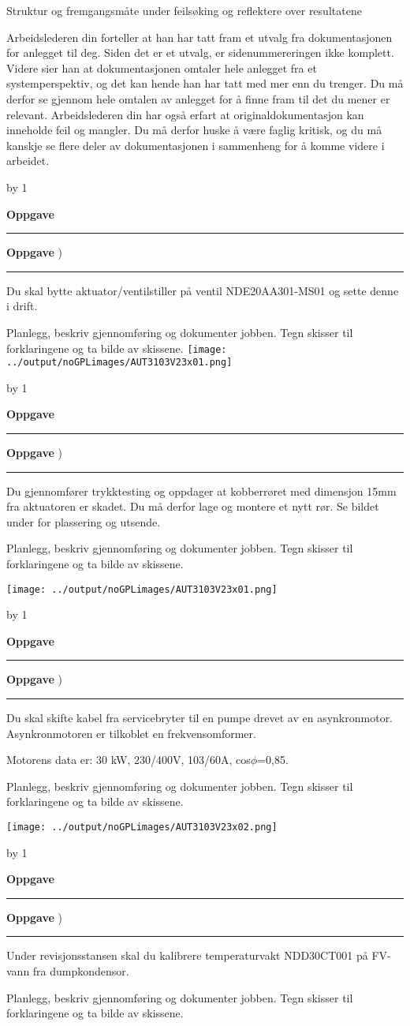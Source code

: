 \documentclass[12pt,a4paper]{article}
\def\oppgave{
            \advance\questnum by 1
	    \ifthenelse{\questnum>0\AND \questnum<9}
	    {
                \vskip 1cm
		\textbf{Oppgave}\hskip 5pt\the\questnum \hfill \hfill
		\vskip 3pt
		\hrule
	\vskip 0.5cm}
	{
                \vskip 1cm
		\textbf{Oppgave}\hskip 5pt \the\questnum \hfill \hfill)
		\vskip 3pt \hrule \vskip 0.5cm }

		}
\begin{document}
Struktur og fremgangsmåte under feilsøking og reflektere over resultatene

\vskip  0.25cm
 

Arbeidslederen din forteller at han har tatt fram et utvalg fra dokumentasjonen for anlegget til deg. Siden det er et utvalg, er sidenummereringen ikke komplett. Videre sier han at dokumentasjonen omtaler hele anlegget fra et systemperspektiv, og det kan hende han har tatt med mer enn du trenger. Du må derfor se gjennom hele omtalen av anlegget for å finne fram til det du mener er relevant. Arbeidslederen din har også erfart at originaldokumentasjon kan inneholde feil og mangler. Du må derfor huske å være faglig kritisk, og du må kanskje se flere deler av dokumentasjonen i sammenheng for å komme videre i arbeidet.
\oppgave{}%
Du skal bytte aktuator/ventilstiller på ventil NDE20AA301-MS01 og sette denne i drift. 
\vskip 0.25cm

Planlegg, beskriv gjennomføring og dokumenter jobben. Tegn skisser til forklaringene og ta bilde av skissene. 
\vskip 0.25cm
\texttt{[image: ../output/noGPLimages/AUT3103V23x01.png]}\\
\newpage
\oppgave{}%
Du gjennomfører trykktesting og oppdager at kobberrøret med dimensjon 15mm fra aktuatoren er skadet. Du må derfor lage og montere et nytt rør. Se bildet under for plassering og utsende. 

\vskip 0.25cm
Planlegg, beskriv gjennomføring og dokumenter jobben. Tegn skisser til forklaringene og ta bilde av skissene.

\vskip 0.25cm
\texttt{[image: ../output/noGPLimages/AUT3103V23x01.png]}\\
\newpage
\oppgave{}%
Du skal skifte kabel fra servicebryter til en pumpe drevet av en asynkronmotor. Asynkronmotoren er tilkoblet en frekvensomformer. 

\vskip 0.25cm
Motorens data er: 30 kW, 230/400V, 103/60A, cos$\phi$=0,85. 

\vskip 0.25cm
Planlegg, beskriv gjennomføring og dokumenter jobben. Tegn skisser til forklaringene og ta bilde av skissene.

\vskip 0.25cm
\texttt{[image: ../output/noGPLimages/AUT3103V23x02.png]}\\
\newpage
\oppgave{}%
Under revisjonsstansen skal du kalibrere temperaturvakt NDD30CT001 på FV-vann fra dumpkondensor. 

\vskip 0.25cm
Planlegg, beskriv gjennomføring og dokumenter jobben. Tegn skisser til forklaringene og ta bilde av skissene.
\end{document}
